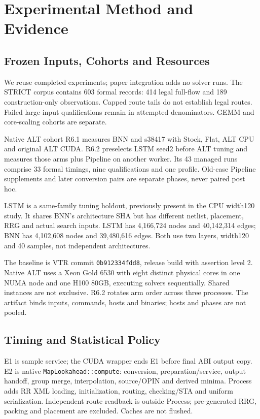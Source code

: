 \section{Experimental Method and Evidence}
\subsection{Frozen Inputs, Cohorts and Resources}
We reuse completed experiments; paper integration adds no solver runs. The STRICT corpus contains 603 formal records: 414 legal full-flow and 189 construction-only observations. Capped route tails do not establish legal routes. Failed large-input qualifications remain in attempted denominators. GEMM and core-scaling cohorts are separate.

Native ALT cohort R6.1 measures BNN and s38417 with Stock, Flat, ALT CPU and original ALT CUDA. R6.2 preselects LSTM seed2 before ALT tuning and measures those arms plus Pipeline on another worker. Its 43 managed runs comprise 33 formal timings, nine qualifications and one profile. Old-case Pipeline supplements and later conversion pairs are separate phases, never paired post hoc.

LSTM is a same-family tuning holdout, previously present in the CPU width120 study. It shares BNN's architecture SHA but has different netlist, placement, RRG and actual search inputs. LSTM has 4,166,724 nodes and 40,142,314 edges; BNN has 4,102,608 nodes and 39,480,616 edges. Both use two layers, width120 and 40 samples, not independent architectures.

The baseline is VTR commit \texttt{0b912334fdd8}, release build with assertion level 2. Native ALT uses a Xeon Gold 6530 with eight distinct physical cores in one NUMA node and one H100 80GB, executing solvers sequentially. Shared instances are not exclusive. R6.2 rotates arm order across three processes. The artifact binds inputs, commands, hosts and binaries; hosts and phases are not pooled.

\subsection{Timing and Statistical Policy}
E1 is sample service; the CUDA wrapper ends E1 before final ABI output copy. E2 is native \texttt{MapLookahead::compute}: conversion, preparation/service, output handoff, group merge, interpolation, source/OPIN and derived minima. Process adds RR XML loading, initialization, routing, checking/STA and uniform serialization. Independent route readback is outside Process; pre-generated RRG, packing and placement are excluded. Caches are not flushed.

